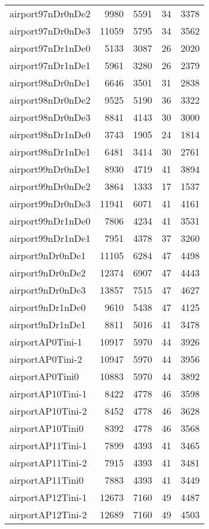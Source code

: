 \begin{longtable}{lrrrr}
airport97nDr0nDe2 & 9980 & 5591 & 34 & 3378 \\
airport97nDr0nDe3 & 11059 & 5795 & 34 & 3562 \\
airport97nDr1nDe0 & 5133 & 3087 & 26 & 2020 \\
airport97nDr1nDe1 & 5961 & 3280 & 26 & 2379 \\
airport98nDr0nDe1 & 6646 & 3501 & 31 & 2838 \\
airport98nDr0nDe2 & 9525 & 5190 & 36 & 3322 \\
airport98nDr0nDe3 & 8841 & 4143 & 30 & 3000 \\
airport98nDr1nDe0 & 3743 & 1905 & 24 & 1814 \\
airport98nDr1nDe1 & 6481 & 3414 & 30 & 2761 \\
airport99nDr0nDe1 & 8930 & 4719 & 41 & 3894 \\
airport99nDr0nDe2 & 3864 & 1333 & 17 & 1537 \\
airport99nDr0nDe3 & 11941 & 6071 & 41 & 4161 \\
airport99nDr1nDe0 & 7806 & 4234 & 41 & 3531 \\
airport99nDr1nDe1 & 7951 & 4378 & 37 & 3260 \\
airport9nDr0nDe1 & 11105 & 6284 & 47 & 4498 \\
airport9nDr0nDe2 & 12374 & 6907 & 47 & 4443 \\
airport9nDr0nDe3 & 13857 & 7515 & 47 & 4627 \\
airport9nDr1nDe0 & 9610 & 5438 & 47 & 4125 \\
airport9nDr1nDe1 & 8811 & 5016 & 41 & 3478 \\
airportAP0Tini-1 & 10917 & 5970 & 44 & 3926 \\
airportAP0Tini-2 & 10947 & 5970 & 44 & 3956 \\
airportAP0Tini0 & 10883 & 5970 & 44 & 3892 \\
airportAP10Tini-1 & 8422 & 4778 & 46 & 3598 \\
airportAP10Tini-2 & 8452 & 4778 & 46 & 3628 \\
airportAP10Tini0 & 8392 & 4778 & 46 & 3568 \\
airportAP11Tini-1 & 7899 & 4393 & 41 & 3465 \\
airportAP11Tini-2 & 7915 & 4393 & 41 & 3481 \\
airportAP11Tini0 & 7883 & 4393 & 41 & 3449 \\
airportAP12Tini-1 & 12673 & 7160 & 49 & 4487 \\
airportAP12Tini-2 & 12689 & 7160 & 49 & 4503 \\

\end{longtable}
